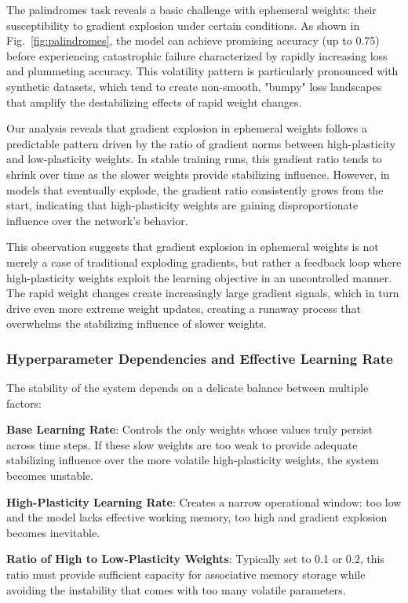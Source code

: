 The palindromes task reveals a basic challenge with ephemeral weights: their susceptibility to gradient explosion under certain conditions. As shown in Fig.~\ref{fig:palindromes}, the model can achieve promising accuracy (up to 0.75) before experiencing catastrophic failure characterized by rapidly increasing loss and plummeting accuracy. This volatility pattern is particularly pronounced with synthetic datasets, which tend to create non-smooth, "bumpy" loss landscapes that amplify the destabilizing effects of rapid weight changes.

Our analysis reveals that gradient explosion in ephemeral weights follows a predictable pattern driven by the ratio of gradient norms between high-plasticity and low-plasticity weights. In stable training runs, this gradient ratio tends to shrink over time as the slower weights provide stabilizing influence. However, in models that eventually explode, the gradient ratio consistently grows from the start, indicating that high-plasticity weights are gaining disproportionate influence over the network's behavior.

This observation suggests that gradient explosion in ephemeral weights is not merely a case of traditional exploding gradients, but rather a feedback loop where high-plasticity weights exploit the learning objective in an uncontrolled manner. The rapid weight changes create increasingly large gradient signals, which in turn drive even more extreme weight updates, creating a runaway process that overwhelms the stabilizing influence of slower weights.

\subsubsection{Hyperparameter Dependencies and Effective Learning Rate}

The stability of the system depends on a delicate balance between multiple factors:

\textbf{Base Learning Rate}: Controls the only weights whose values truly persist across time steps. If these slow weights are too weak to provide adequate stabilizing influence over the more volatile high-plasticity weights, the system becomes unstable.

\textbf{High-Plasticity Learning Rate}: Creates a narrow operational window: too low and the model lacks effective working memory, too high and gradient explosion becomes inevitable.

\textbf{Ratio of High to Low-Plasticity Weights}: Typically set to 0.1 or 0.2, this ratio must provide sufficient capacity for associative memory storage while avoiding the instability that comes with too many volatile parameters.

